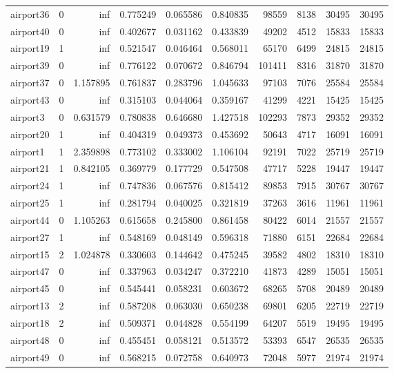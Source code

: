 \documentclass[../../../thesis.tex]{subfiles}
\begin{document}
\begin{longtable}{|l|r|r|r|r|r|r|r|r|r|}
airport36 & 0 & inf & 0.775249 & 0.065586 & 0.840835 & 98559 & 8138 & 30495 & 30495 \\
airport40 & 0 & inf & 0.402677 & 0.031162 & 0.433839 & 49202 & 4512 & 15833 & 15833 \\
airport19 & 1 & inf & 0.521547 & 0.046464 & 0.568011 & 65170 & 6499 & 24815 & 24815 \\
airport39 & 0 & inf & 0.776122 & 0.070672 & 0.846794 & 101411 & 8316 & 31870 & 31870 \\
airport37 & 0 & 1.157895 & 0.761837 & 0.283796 & 1.045633 & 97103 & 7076 & 25584 & 25584 \\
airport43 & 0 & inf & 0.315103 & 0.044064 & 0.359167 & 41299 & 4221 & 15425 & 15425 \\
airport3 & 0 & 0.631579 & 0.780838 & 0.646680 & 1.427518 & 102293 & 7873 & 29352 & 29352 \\
airport20 & 1 & inf & 0.404319 & 0.049373 & 0.453692 & 50643 & 4717 & 16091 & 16091 \\
airport1 & 1 & 2.359898 & 0.773102 & 0.333002 & 1.106104 & 92191 & 7022 & 25719 & 25719 \\
airport21 & 1 & 0.842105 & 0.369779 & 0.177729 & 0.547508 & 47717 & 5228 & 19447 & 19447 \\
airport24 & 1 & inf & 0.747836 & 0.067576 & 0.815412 & 89853 & 7915 & 30767 & 30767 \\
airport25 & 1 & inf & 0.281794 & 0.040025 & 0.321819 & 37263 & 3616 & 11961 & 11961 \\
airport44 & 0 & 1.105263 & 0.615658 & 0.245800 & 0.861458 & 80422 & 6014 & 21557 & 21557 \\
airport27 & 1 & inf & 0.548169 & 0.048149 & 0.596318 & 71880 & 6151 & 22684 & 22684 \\
airport15 & 2 & 1.024878 & 0.330603 & 0.144642 & 0.475245 & 39582 & 4802 & 18310 & 18310 \\
airport47 & 0 & inf & 0.337963 & 0.034247 & 0.372210 & 41873 & 4289 & 15051 & 15051 \\
airport45 & 0 & inf & 0.545441 & 0.058231 & 0.603672 & 68265 & 5708 & 20489 & 20489 \\
airport13 & 2 & inf & 0.587208 & 0.063030 & 0.650238 & 69801 & 6205 & 22719 & 22719 \\
airport18 & 2 & inf & 0.509371 & 0.044828 & 0.554199 & 64207 & 5519 & 19495 & 19495 \\
airport48 & 0 & inf & 0.455451 & 0.058121 & 0.513572 & 53393 & 6547 & 26535 & 26535 \\
airport49 & 0 & inf & 0.568215 & 0.072758 & 0.640973 & 72048 & 5977 & 21974 & 21974 \\

\end{longtable}
\end{document}
